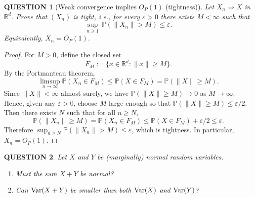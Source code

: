 \documentclass[12pt]{article}
\renewcommand{\(}{\left(}%
\renewcommand{\)}{\right)}%
\renewcommand{\[}{\left[}%
\renewcommand{\]}{\right]}%
\newcommand{\var}{{\rm Var}}
\newtheorem{question}{QUESTION}[section]}
\newtheorem{proof}{Proof.}}
\begin{document}
\begin{question}[Weak convergence implies $O_P(1)$ (tightness)]
Let $X_n \Rightarrow X$ in $\mathbb{R}^d$. Prove that $(X_n)$ is tight, i.e., for every $\varepsilon>0$ there exists $M<\infty$ such that
\begin{equation*}
\sup_{n\ge 1}\,\mathbb{P}(\|X_n\|>M) \le \varepsilon .
\end{equation*}
Equivalently, $X_n = O_P(1)$.
\end{question}

\begin{proof}
For $M>0$, define the closed set
\begin{equation*}
F_M := \{x\in\mathbb{R}^d : \|x\|\ge M\}.
\end{equation*}
By the Portmanteau theorem,
\begin{equation*}
\limsup_{n\to\infty}\mathbb{P}(X_n\in F_M) \le \mathbb{P}(X\in F_M)
= \mathbb{P}(\|X\|\ge M).
\end{equation*}
Since $\|X\|<\infty$ almost surely, we have $\mathbb{P}(\|X\|\ge M)\to 0$ as $M\to\infty$. Hence, given any $\varepsilon>0$, choose $M$ large enough so that $\mathbb{P}(\|X\|\ge M)\le \varepsilon/2$. Then there exists $N$ such that for all $n\ge N$,
\begin{equation*}
\mathbb{P}(\|X_n\|\ge M)=\mathbb{P}(X_n\in F_M)
\le \mathbb{P}(X\in F_M)+\varepsilon/2 \le \varepsilon .
\end{equation*}
Therefore $\sup_{n\ge N}\mathbb{P}(\|X_n\|>M)\le \varepsilon$, which is tightness. In particular, $X_n=O_P(1)$.
\end{proof}

\begin{question}
Let $X$ and $Y$ be (marginally) normal random variables.
\begin{enumerate}
\item[(a)] Must the sum $X+Y$ be normal?
\item[(b)] Can $\var(X+Y)$ be smaller than both $\var(X)$ and $\var(Y)$?
\end{enumerate}
\end{question}
\end{document}
